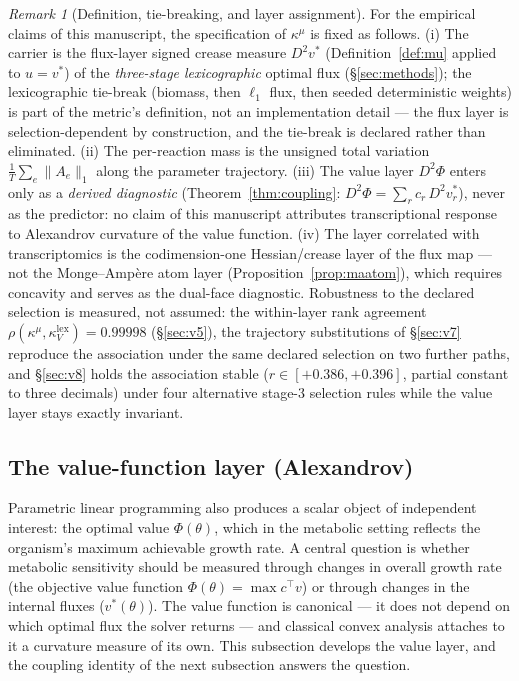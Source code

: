 \documentclass[11pt,a4paper]{article}
\theoremstyle{plain}
\theoremstyle{definition}
\theoremstyle{remark}
\newtheorem{remark}[theorem]{Remark}
\newcommand{\kk}{\kappa_{\!V}}
\newcommand{\kmu}{\kappa^{\mu}}
\begin{document}
\begin{remark}[Definition, tie-breaking, and layer assignment]
\label{rem:lock}
For the empirical claims of this manuscript, the specification of
$\kmu$ is fixed as follows. (i) The carrier is the flux-layer signed crease measure
$D^2 v^*$ (Definition~\ref{def:mu} applied to $u = v^*$) of the
\emph{three-stage lexicographic} optimal flux (\S\ref{sec:methods});
the lexicographic tie-break (biomass, then $\ell_1$ flux, then seeded
deterministic weights) is part of the metric's definition, not an
implementation detail --- the flux layer is selection-dependent by
construction, and the tie-break is declared rather than eliminated.
(ii) The per-reaction mass is the unsigned total variation
$\frac{1}{T}\sum_e \|A_e\|_1$ along the parameter trajectory.
(iii) The value layer $D^2\Phi$ enters only as a \emph{derived
diagnostic} (Theorem~\ref{thm:coupling}:
$D^2\Phi = \sum_r c_r\, D^2 v^*_r$), never as the predictor: no claim
of this manuscript attributes transcriptional response to Alexandrov
curvature of the value function. (iv) The layer correlated with
transcriptomics is the codimension-one Hessian/crease layer of the
flux map --- not the Monge--Amp\`ere atom layer
(Proposition~\ref{prop:maatom}), which requires concavity and serves
as the dual-face diagnostic. Robustness to the declared selection is
measured, not assumed: the within-layer rank agreement
$\rho(\kmu, \kk^{\mathrm{lex}}) = 0.99998$ (\S\ref{sec:v5}), the trajectory substitutions of \S\ref{sec:v7} reproduce the association under the same declared selection on two further paths, and \S\ref{sec:v8} holds the
association stable ($r \in [+0.386, +0.396]$, partial constant to
three decimals) under four alternative stage-3 selection rules while
the value layer stays exactly invariant.
\end{remark}

\subsection{The value-function layer (Alexandrov)}

Parametric linear programming also produces a scalar object of
independent interest: the optimal value $\Phi(\theta)$, which in the
metabolic setting reflects the organism's maximum achievable growth
rate. A central question is whether metabolic sensitivity should be
measured through changes in overall growth rate (the objective value
function $\Phi(\theta) = \max c^\top v$) or through changes in the
internal fluxes ($v^*(\theta)$). The value function is canonical ---
it does not depend on which optimal flux the solver returns --- and
classical convex analysis attaches to it a curvature measure of its
own. This subsection develops the value layer, and the coupling
identity of the next subsection answers the question.
\end{document}
